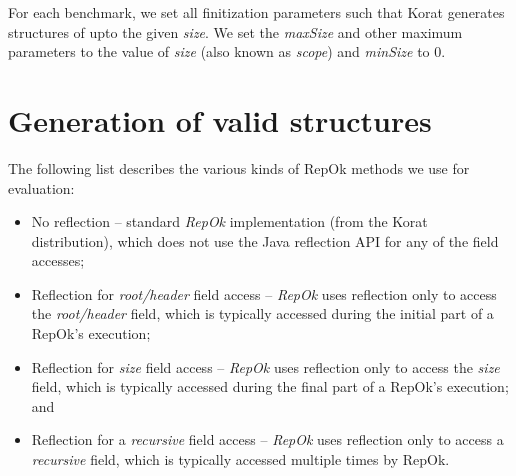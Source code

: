 For each benchmark, we set all finitization parameters such that Korat
generates structures of upto the given \emph{size}. We set the
\emph{maxSize} and other maximum parameters to the value of
\emph{size} (also known as \emph{scope}) and \emph{minSize} to 0.

\section{Generation of valid structures}
\label{sec:generation-of-valid-structures}

\par
\noindent The following list describes the various kinds of RepOk
methods we use for evaluation:
\begin{itemize}
\item No reflection -- standard \emph{RepOk} implementation (from the
  Korat distribution), which does not use the Java reflection API for
  any of the field accesses;
\item Reflection for \emph{root/header} field access -- \emph{RepOk}
  uses reflection only to access the \emph{root/header} field, which
  is typically accessed during the initial part of a RepOk's
  execution;
\item Reflection for \emph{size} field access -- \emph{RepOk} uses
  reflection only to access the \emph{size} field, which is typically
  accessed during the final part of a RepOk's execution; and
\item Reflection for a \emph{recursive} field access -- \emph{RepOk}
  uses reflection only to access a \emph{recursive} field, which is
  typically accessed multiple times by RepOk.
\end{itemize}

